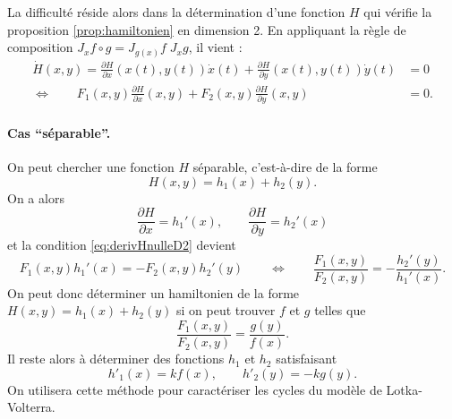 La difficulté réside alors dans la détermination d'une fonction $H$ qui vérifie la proposition \ref{prop:hamiltonien} en dimension 2. En appliquant la règle de composition $J_x f \circ g = J_{g(x)} f \; J_x g$, il vient : 
\begin{align} \label{eq:derivHnulleD2}
  \dot H(x, y) =
  \frac{\partial H}{\partial x} (x(t), y(t)) \dot x(t) +
  \frac{\partial H}{\partial y} (x(t), y(t)) \dot y(t) & = 0 \nonumber \\
  \Leftrightarrow \qquad 
  F_1(x, y) \frac{\partial H}{\partial x} (x, y) +
  F_2(x, y) \frac{\partial H}{\partial y} (x, y) & = 0.
\end{align}

\paragraph*{Cas ``séparable''.} 
On peut chercher une fonction $H$ séparable, c'est-à-dire de la forme
$$
H(x, y) = h_1(x) + h_2(y).
$$
On a alors
$$
\frac{\partial H}{\partial x} = h_1'(x), \qquad
\frac{\partial H}{\partial y} = h_2'(x)
$$
et la condition \eqref{eq:derivHnulleD2} devient
$$
F_1(x, y) h_1'(x) = -F_2(x, y) h_2'(y)
\qquad \Leftrightarrow \qquad
\frac{F_1(x, y)}{F_2(x, y)} = -\frac{h_2'(y)}{h_1'(x)}.
$$
On peut donc déterminer un hamiltonien de la forme $H(x, y) = h_1(x) + h_2(y)$ si on peut trouver $f$ et $g$ telles que
$$
\frac{F_1(x, y)}{F_2(x, y)} = \frac{g(y)}{f(x)}.
$$
Il reste alors à déterminer des fonctions $h_1$ et $h_2$ satisfaisant
$$
h'_1(x) = k f(x), \qquad
h'_2(y) = - k g(y).
$$
On utilisera cette méthode pour caractériser les cycles du modèle de Lotka-Volterra.
